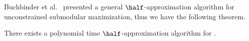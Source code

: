 Buchbinder et al.~\cite{BFNS15,buchbinder2016deterministic} presented
a general $\half$-approximation algorithm for unconstrained
submodular maximization, thus we have the following theorem.

\begin{theorem}
There exists a polynomial time $\half$-approximation algorithm
for \carpool.
\end{theorem}

